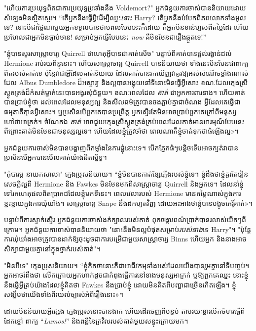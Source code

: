 {{"ហើយ​ការ​ប្រយុទ្ធ​ពិត​ជា​ការ​ប្រយុទ្ធ​ប្រឆាំង​នឹង Voldemort?" អ្នកជំនួយការចាស់បាននិយាយដោយសំឡេងមិនស្ថិតស្ថេរ។ “តើអ្នកនឹងធ្វើអ្វីដើម្បីឈ្នះ\emph{នោះ} Harry? តើអ្នកនឹងបំបែកពិភពលោកទាំងមូលទេ? ទោះបីជាថ្ងៃណាមួយអ្នកទទួលបានថាមពលបែបនេះក៏ដោយ ក៏អ្នកមិនទាន់ហួសពីតម្លៃដែរ ហើយប្រហែលជាអ្នកមិនធ្លាប់មាន! សម្រាប់​អ្នក​ធ្វើ​បែប​នេះ \emph{now} គឺ​មិន​មែន​ជា​រឿង​ឆ្កួត​ទេ!”

"ខ្ញុំបានសួរសាស្រ្តាចារ្យ Quirrell ថាហេតុអ្វីបានជាគាត់សើច" បន្ទាប់ពីគាត់បានផ្តល់រង្វាន់ដល់ Hermione រាប់រយពិន្ទុនោះ។ ហើយសាស្រ្តាចារ្យ Quirrell បាននិយាយថា ទាំងនេះមិនមែនជាពាក្យពិតរបស់គាត់ទេ ប៉ុន្តែវាជាអ្វីដែលគាត់និយាយ ដែលគាត់បានរកឃើញវាគួរឱ្យអស់សំណើចខ្លាំងណាស់ដែល Albus Dumbledore ដ៏អស្ចារ្យ និងល្អបានអង្គុយនៅទីនោះមិនធ្វើអ្វីសោះ ខណៈដែលក្មេងស្រីស្លូតត្រង់ដ៏កំសត់ម្នាក់នេះបានអង្វរសុំជំនួយ។ ខណៈពេលដែល \emph{គាត់} ជាអ្នកការពារនាង។ ហើយគាត់បានប្រាប់ខ្ញុំថា ដល់ពេលដែលមនុស្សល្អ និងសីលធម៌ត្រូវបានចងភ្ជាប់គ្នាជាចំណង អ្វីដែលគេធ្វើជាធម្មតាគឺគ្មានអ្វីសោះ។ ឬប្រសិនបើពួកគេបានប្រព្រឹត្ត អ្នកស្ទើរតែមិនអាចប្រាប់ពួកគេក្រៅពីមនុស្សហៅថាអាក្រក់។ ចំណែកឯ \emph{គាត់} អាចជួយក្មេងស្រីស្លូតត្រង់គ្រប់ពេលដែលគាត់មានអារម្មណ៍បែបនេះ ពីព្រោះគាត់មិនមែនជាមនុស្សល្អទេ។ ហើយ​ដែល​ខ្ញុំ​ត្រូវ​ចាំ​ថា ពេល​ណា​ក៏​ខ្ញុំ​ចាត់​ទុក​ថា​ធំ​ឡើង​ល្អ»។

អ្នកជំនួយការចាស់មិនបានបង្ហាញពីកម្លាំងនៃការផ្លុំនោះទេ។ បើកភ្នែកធំៗបន្តិចទើបអាចក្បត់វាបាន ប្រសិនបើអ្នកបានមើលគាត់យ៉ាងជិតស្និទ្ធ។

"កុំបារម្ភ នាយកសាលា" ក្មេងប្រុសនិយាយ។ “ខ្ញុំមិនបានកាត់ខ្សែភ្លើងរបស់ខ្ញុំទេ។ ខ្ញុំដឹងថាខ្ញុំគួរតែរៀនសេចក្តីល្អពី Hermione និង Fawkes មិនមែនមកពីសាស្រ្តាចារ្យ Quirrell និងអ្នកទេ។ ដែលនាំខ្ញុំទៅរកហេតុផលពិតប្រាកដដែលខ្ញុំមកទីនេះ។ ពេលវេលារបស់ Hermione មានតម្លៃណាស់ក្នុងការខ្ជះខ្ជាយក្នុងការឃុំឃាំង។ សាស្ត្រាចារ្យ Snape នឹង​ដក​ហូត​វិញ ដោយ​អះអាង​ថា​ខ្ញុំ​បាន​បង្ខូច​កេរ្តិ៍​គាត់»។

បន្ទាប់ពីការស្ទាក់ស្ទើរ អ្នកជំនួយការចាស់ងក់ក្បាលរបស់គាត់ ពុកចង្ការពណ៌ប្រាក់បានរលាស់យឺតៗពីក្រោម។ អ្នកជំនួយការចាស់បាននិយាយថា "នោះនឹងមិនល្អបំផុតសម្រាប់\emph{របស់នាង}ទេ Harry"។ "ប៉ុន្តែការឃុំឃាំងអាចត្រូវបានដាក់ឱ្យចុះដូចជាការបម្រើជាមួយសាស្រ្តាចារ្យ Binns ហើយអ្នក និងនាងអាចសិក្សាជាមួយគ្នានៅក្នុងថ្នាក់របស់គាត់"។

"មិនអីទេ" ក្មេងប្រុសនិយាយ។ “ខ្ញុំ​គិត​ថា​នោះ​គឺ​ជា​អាជីវកម្ម​ទាំង​អស់​ដែល​យើង​បាន​រួម​គ្នា​នៅ​ទី​បញ្ចប់។ អ្នកអាចរំពឹងថា លើកក្រោយអ្នកហាក់ដូចជាកំពុងធ្វើការនៅខាងមនុស្សអាក្រក់ ឬឱ្យពួកគេឈ្នះ នោះខ្ញុំនឹងធ្វើអ្វីគ្រប់យ៉ាងដែលខ្ញុំគិតថា Fawkes នឹងប្រាប់ខ្ញុំ ដោយមិនគិតពីបញ្ហាជាច្រើនកើតឡើង។ ខ្ញុំ​សង្ឃឹម​ថា​យើង​ទាំង​ពីរ​យល់​ច្បាស់​អំពី​រឿង​នោះ»។

ដោយមិននិយាយអ្វីផ្សេង ក្មេងប្រុសនោះបានងាក ហើយដើរចេញពីបន្ទប់ តាមរយៈទ្វារបើកចំហរធ្វើពីដែកខ្មៅ ពាក្យ “\emph{Lumos!}” និងពន្លឺនៃក្រវិលរបស់គាត់មួយសន្ទុះក្រោយមក។

}}
